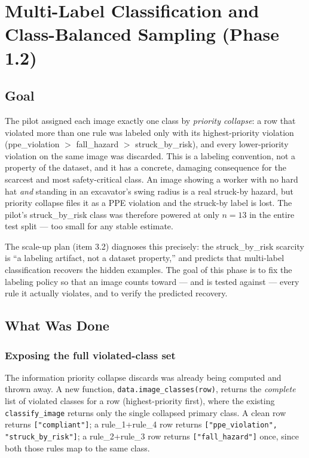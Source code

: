 \chapter{Multi-Label Classification and Class-Balanced Sampling (Phase 1.2)}
\label{chap:p1-2}

\section{Goal}

The pilot assigned each image exactly one class by \emph{priority collapse}: a row that violated more
than one rule was labeled only with its highest-priority violation
(ppe\_violation $>$ fall\_hazard $>$ struck\_by\_risk), and every lower-priority violation on the same
image was discarded. This is a labeling convention, not a property of the dataset, and it has a
concrete, damaging consequence for the scarcest and most safety-critical class. An image showing a
worker with no hard hat \emph{and} standing in an excavator's swing radius is a real struck-by hazard,
but priority collapse files it as a PPE violation and the struck-by label is lost. The pilot's
struck\_by\_risk class was therefore powered at only $n=13$ in the entire test split --- too small for
any stable estimate.

The scale-up plan (item 3.2) diagnoses this precisely: the struck\_by\_risk scarcity is ``a labeling
artifact, not a dataset property,'' and predicts that multi-label classification recovers the hidden
examples. The goal of this phase is to fix the labeling policy so that an image counts toward --- and
is tested against --- every rule it actually violates, and to verify the predicted recovery.

\section{What Was Done}

\subsection{Exposing the full violated-class set}

The information priority collapse discards was already being computed and thrown away. A new function,
\texttt{data.image\_classes(row)}, returns the \emph{complete} list of violated classes for a row
(highest-priority first), where the existing \texttt{classify\_image} returns only the single collapsed
primary class. A clean row returns \texttt{["compliant"]}; a rule\_1+rule\_4 row returns
\texttt{["ppe\_violation", "struck\_by\_risk"]}; a rule\_2+rule\_3 row returns \texttt{["fall\_hazard"]}
once, since both those rules map to the same class.

